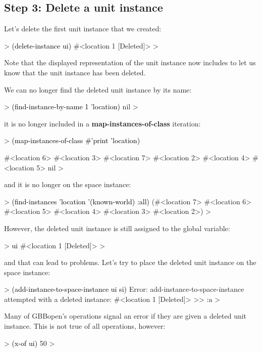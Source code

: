 \documentclass[10pt,twoside,english,pdftex]{article}
\begin{document}
\subsection*{Step 3: Delete a unit instance}

%
%
Let's delete the first  unit instance that we created:
%
\begin{example}\color{darkergray}%
  > \textcolor{black}{(delete-instance ui)}
  #<location 1 [Deleted]>
  >
\end{example}
%
Note that the displayed representation of the unit instance now includes
\code{[Deleted]} to let us know that the unit instance has been deleted.

%
%
%
We can no longer find the deleted unit instance by its name:
%
\begin{example}\color{darkergray}%
  > \textcolor{black}{(find-instance-by-name 1 'location)}
  nil
  >
\end{example}
%
it is no longer included in a \textbf{map-instances-of-class} iteration:
%
\begin{example}\color{darkergray}%
  > \textcolor{black}{(map-instances-of-class #'print 'location)}

  #<location 6> 
  #<location 3> 
  #<location 7> 
  #<location 2> 
  #<location 4> 
  #<location 5> 
  nil
  >
\end{example}
%
and it is no longer on the  space instance:
%
\begin{example}\color{darkergray}%
  > \textcolor{black}{(find-instances 'location '(known-world) :all)}
  (#<location 7> #<location 6> #<location 5> #<location 4> #<location 3>
   #<location 2>)
  >
\end{example}

%
However, the deleted  unit instance is still assigned to the
 global variable:
%
\begin{example}\color{darkergray}%
  > \textcolor{black}{ui}
  #<location 1 [Deleted]>
  >
\end{example}
%
and that can lead to problems.  Let's try to place the deleted 
unit instance on the  space instance:
%
\begin{example}\color{darkergray}%
  > \textcolor{black}{(add-instance-to-space-instance ui si)}
  Error: add-instance-to-space-instance attempted with a deleted instance:
         #<location 1 [Deleted]>
  >> \textcolor{black}{:a}
  >
\end{example}
%
Many of GBBopen's operations signal an error if they are given a deleted unit
instance.  This is not true of all operations, however:
%
\begin{example}\color{darkergray}%
  > \textcolor{black}{(x-of ui)}
  50
  >
\end{example}
\end{document}
